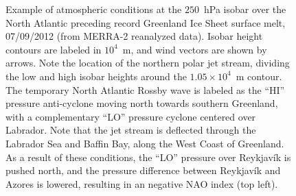 \documentclass[11pt]{report}
\begin{document}
\begin{figure}[h]
\centering
{}
\caption[Atmospheric Circulation Around Greenland]{Example of atmospheric conditions at the $250$~hPa isobar over the North Atlantic preceding record Greenland Ice Sheet surface melt, 07/09/2012 (from MERRA-2 reanalyzed data). Isobar height contours are labeled in $10^4$~m, and wind vectors are shown by arrows. Note the location of the northern polar jet stream, dividing the low and high isobar heights around the $1.05\times 10^{4}$~m contour. The temporary North Atlantic Rossby wave is labeled as the ``HI'' pressure anti-cyclone moving north towards southern Greenland, with a complementary ``LO'' pressure cyclone centered over Labrador. Note that the jet stream is deflected through the Labrador Sea and Baffin Bay, along the West Coast of Greenland. As a result of these conditions, the ``LO'' pressure over Reykjav\'ik is pushed north, and the pressure difference between Reykjav\'ik  and Azores is lowered, resulting in an negative NAO index (top left).} \label{fig:jetstream}
\end{figure}
\end{document}
